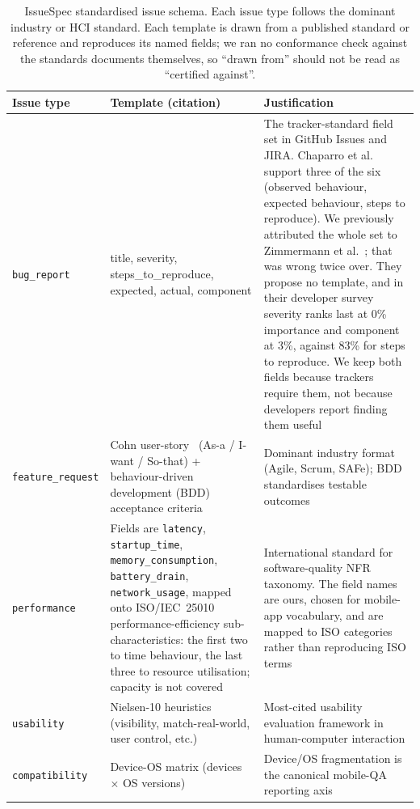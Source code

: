\documentclass[preprint,12pt]{elsarticle}
\begin{document}
\begin{table}[t]
  \centering
  \footnotesize
  
  \begin{tabular}{@{}p{2.2cm}p{8.5cm}p{6.0cm}@{}}
  \toprule
  Issue type & Template (citation) & Justification \\
  \midrule
  \texttt{bug\_report} & title, severity, steps\_to\_reproduce, expected, actual, component &
  The tracker-standard field set in GitHub Issues and JIRA. Chaparro et
  al.~\cite{chaparro2017detecting} support three of the six (observed behaviour, expected
  behaviour, steps to reproduce). We previously attributed the whole set to
  Zimmermann et al.~\cite{zimmermann2010makes}; that was wrong twice over. They propose no
  template, and in their developer survey severity ranks last at 0\% importance and component at
  3\%, against 83\% for steps to reproduce. We keep both fields because trackers require them, not
  because developers report finding them useful \\
  \texttt{feature\_request} & Cohn user-story~\cite{cohn2004user} (As-a / I-want / So-that) +
  behaviour-driven development (BDD) acceptance criteria~\cite{hellesoy2017cucumber} & Dominant
  industry format (Agile, Scrum, SAFe); BDD standardises testable outcomes \\
  \texttt{performance} & Fields are \texttt{latency}, \texttt{startup\_time},
  \texttt{memory\_consumption}, \texttt{battery\_drain}, \texttt{network\_usage}, mapped onto
  ISO/IEC~25010~\cite{international2011systems} performance-efficiency sub-characteristics: the
  first two to time behaviour, the last three to resource utilisation; capacity is not covered &
  International standard for software-quality NFR taxonomy. The field names are ours, chosen for
  mobile-app vocabulary, and are mapped to ISO categories rather than reproducing ISO terms \\
  \texttt{usability} & Nielsen-10 heuristics~\cite{nielsen1994usability} (visibility, match-real-world,
  user control, etc.) & Most-cited usability evaluation framework in human-computer interaction
  \\
  \texttt{compatibility} & Device-OS matrix (devices $\times$ OS
  versions)~\cite{joorabchi2013real} & Device/OS fragmentation is the canonical mobile-QA
  reporting axis \\
  \bottomrule
  \end{tabular}
\caption{IssueSpec standardised issue schema. Each issue type follows the dominant industry or
  HCI standard. Each template is drawn from a published standard or reference and reproduces its
  named fields; we ran no conformance check against the standards documents themselves, so
  ``drawn from'' should not be read as ``certified against''.}\label{tab:templates}
  \end{table}
\end{document}
